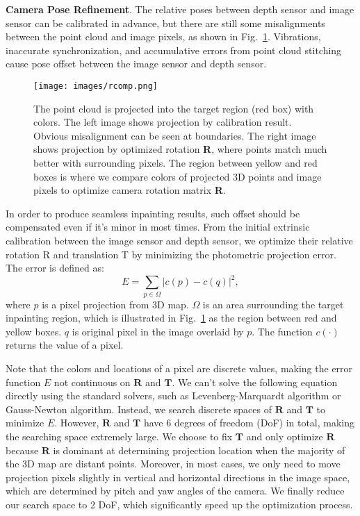 \documentclass[runningheads]{llncs}
\begin{document}
\textbf{Camera Pose Refinement}. The relative poses between depth sensor and image sensor can be calibrated in advance, but there are still some misalignments between the point cloud and image pixels, as shown in Fig.~\ref{fig:misalignment}. Vibrations, inaccurate synchronization, and accumulative errors from point cloud stitching cause pose offset between the image sensor and depth sensor.

\begin{figure}[t!]
\centering
\texttt{[image: images/rcomp.png]}
   \caption{The point cloud is projected into the target region (red box) with colors. The left image shows projection by calibration result. Obvious misalignment can be seen at boundaries. The right image shows projection by optimized rotation \textbf{R}, where points match much better with surrounding pixels. The region between yellow and red boxes is where we compare colors of projected 3D points and image pixels to optimize camera rotation matrix \textbf{R}.
}
\label{fig:misalignment}
\end{figure}

In order to produce seamless inpainting results, such offset should be compensated even if it's minor in most times. From the initial extrinsic calibration between the image sensor and depth sensor, we optimize their relative rotation R and translation T by minimizing the photometric projection error. The error is defined as:
\begin{equation}
    E = \sum_{p\in\Omega}| c(p) - c(q) |^2,
	\label{equ:termCor}
\end{equation} 
where $p$ is a pixel projection from 3D map. $\Omega$ is an area surrounding the target inpainting region, which is illustrated in Fig.~\ref{fig:misalignment} as the region between red and yellow boxes. $q$ is original pixel in the image overlaid by $p$. The function $c(\cdot)$ returns the value of a pixel. 

Note that the colors and locations of a pixel are discrete values, making the error function $E$ not continuous on $\mathbf{R}$ and $\mathbf{T}$. We can't solve the following equation directly using the standard solvers, such as Levenberg-Marquardt algorithm or Gauss-Newton algorithm. Instead, we search discrete spaces of $\mathbf{R}$ and $\mathbf{T}$ to minimize $E$. However, $\mathbf{R}$ and $\mathbf{T}$ have 6 degrees of freedom (DoF) in total, making the searching space extremely large. We choose to fix $\mathbf{T}$ and only optimize $\mathbf{R}$ because $\mathbf{R}$ is dominant at determining projection location when the majority of the 3D map are distant points. Moreover, in most cases, we only need to move projection pixels slightly in vertical and horizontal directions in the image space, which are determined by pitch and yaw angles of the camera. We finally reduce our search space to 2 DoF, which significantly speed up the optimization process.
\end{document}
